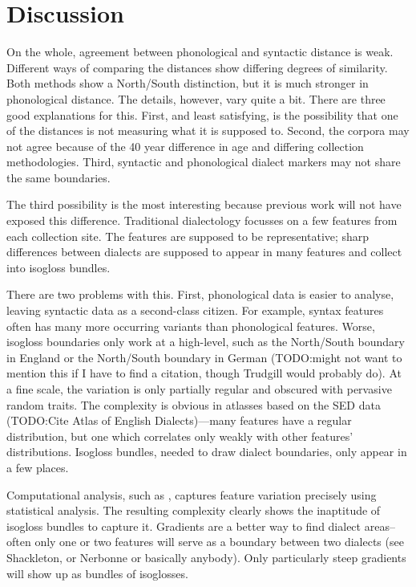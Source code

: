 \documentclass[11pt]{article}
\begin{document}
\section{Discussion}

On the whole, agreement between phonological and syntactic distance is
weak. Different ways of comparing the distances show differing degrees
of similarity. Both methods show a North/South distinction, but it is
much stronger in phonological distance. The details, however, vary
quite a bit. There are three good explanations for this. First, and
least satisfying, is the possibility that one of the distances is not
measuring what it is supposed to. Second, the corpora may not agree
because of the 40 year difference in age and differing collection
methodologies. Third, syntactic and phonological dialect markers may
not share the same boundaries.

The third possibility is the most interesting because previous work
will not have exposed this difference. Traditional dialectology
focusses on a few features from each collection site. The features
are supposed to be representative; sharp differences between dialects
are supposed to appear in many features and collect into isogloss
bundles.

There are two problems with this. First, phonological data is easier
to analyse, leaving syntactic data as a second-class citizen. For
example, syntax features often has many more occurring variants than
phonological features. Worse, isogloss boundaries only work at a
high-level, such as the North/South boundary in England or the
North/South boundary in German (TODO:might not want to mention this if
I have to find a citation, though Trudgill would probably do). At a
fine scale, the variation is only partially regular and obscured with
pervasive random traits. The complexity is obvious in atlasses based
on the SED data (TODO:Cite Atlas of English Dialects)---many features
have a regular distribution, but one which correlates only weakly with
other features' distributions. Isogloss bundles, needed to draw
dialect boundaries, only appear in a few places.

Computational analysis, such as
\cite{shackleton07}, captures feature variation precisely using
statistical analysis. The resulting complexity clearly shows the
inaptitude of isogloss bundles to capture it. Gradients are a better
way to find dialect areas--often only one or two features will serve
as a boundary between two dialects (see Shackleton, or Nerbonne or
basically anybody). Only particularly steep gradients will show
up as bundles of isoglosses.
\end{document}
